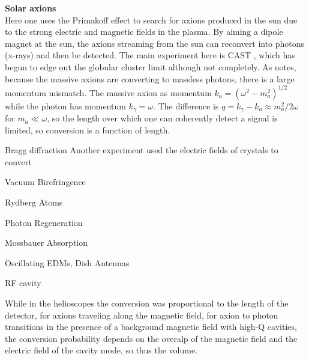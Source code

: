 \documentclass[12pt,twosides]{book}
\begin{document}
\begin{description}

\item \textbf{Solar axions} \hfill \\

Here one uses the Primakoff effect to search for axions produced in the sun due to the strong electric and magnetic fields in the plasma. By aiming a dipole magnet at the sun, the axions streaming from the sun can reconvert into photons (x-rays) and then be detected. The main experiment here is CAST \cite{cast11}, which has begun to edge out the globular cluster limit although not completely.  As \cite{raffelt08} notes, because the massive axions are converting to massless photons, there is a large momentum mismatch. The massive axion as momentum $k_a = (\omega^2 - m_a^2)^{1/2}$ while the photon has momentum $k_\gamma = \omega$. The difference is $q = k_\gamma - k_a \approx m_a^2/2\omega$ for $m_a \ll \omega$, so the length over which one can coherently detect a signal is limited, so conversion is a function of length.

\item{Bragg diffraction}
Another experiment used the electric fields of crystals to convert 

\item{Vacuum Birefringence}

\item{Rydberg Atoms}

\item{Photon Regeneration}


\item{Mossbauer Absorption}

\item{Oscillating EDMs, Dish Antennas}

\item{RF cavity}

While in the helioscopes the conversion was proportional to the length of the detector, for axions traveling along the magnetic field, for axion to photon transitions in the presence of a background magnetic field with high-Q cavities, the conversion probability depends on the overalp of the magnetic field and the electric field of the cavity mode, so thus the volume.

\end{description}
\end{document}
